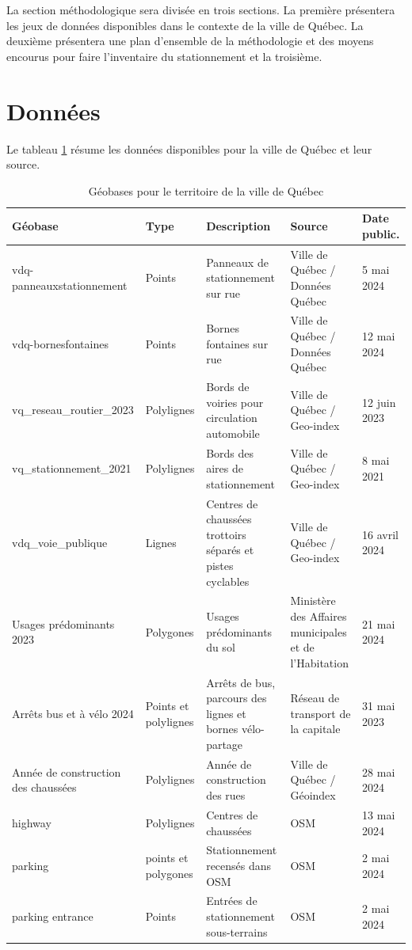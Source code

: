 \label{sec:Methodologie}


La section méthodologique sera divisée en trois sections. La première présentera les jeux de données disponibles dans le contexte de la ville de Québec. La deuxième présentera une plan d'ensemble de la méthodologie et des moyens encourus pour faire l'inventaire du stationnement et la troisième.


\section{Données}
Le tableau \ref{tab:donnees_disponibles_Québec} résume les données disponibles pour la ville de Québec et leur source.
\begin{landscape}
\begin{table}[h!]
  \centering
   \begin{tabular}{l l p{.3 \linewidth} p{.15\linewidth} l } 
   \hline
   Géobase & Type & Description  & Source & Date public.\\ 
   \hline
   vdq-panneauxstationnement    & Points        & Panneaux de stationnement sur rue          & Ville de Québec / Données Québec  & 5 mai 2024 \\
   \hline
   vdq-bornesfontaines          & Points        & Bornes fontaines sur rue                   & Ville de Québec / Données Québec & 12 mai 2024 \\
   \hline
   vq\_reseau\_routier\_2023 & Polylignes    & Bords de voiries pour circulation automobile  & Ville de Québec / Geo-index  & 12 juin 2023\\ 
   \hline
   vq\_stationnement\_2021  & Polylignes    & Bords des aires de stationnement           & Ville de Québec / Geo-index & 8 mai 2021\\
   \hline
   vdq\_voie\_publique            & Lignes        & Centres de chaussées trottoirs séparés et pistes cyclables & Ville de Québec / Geo-index & 16 avril 2024 \\
   \hline
   Usages prédominants 2023  & Polygones & Usages prédominants du sol &   Ministère des Affaires municipales et de l'Habitation & 21 mai 2024 \\
   \hline
   Arrêts bus et à vélo 2024 & Points et polylignes & Arrêts de bus, parcours des lignes et bornes vélo-partage & Réseau de transport de la capitale & 31 mai 2023 \\
   \hline
   Année de construction des chaussées & Polylignes & Année de construction des rues & Ville de Québec / Géoindex & 28 mai 2024 \\
   \hline
   highway & Polylignes & Centres de chaussées & \ac{OSM} & 13 mai 2024\\
   \hline
   parking & points et polygones & Stationnement recensés dans \ac{OSM} & \ac{OSM} & 2 mai 2024 \\
   \hline
    parking entrance & Points & Entrées de stationnement sous-terrains  & \ac{OSM} & 2 mai 2024 \\
    \hline
   \end{tabular}
   \caption{Géobases pour le territoire de la ville de Québec}
   \label{tab:donnees_disponibles_Québec}
\end{table}


\end{landscape}
